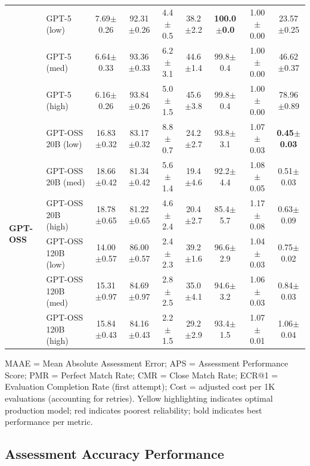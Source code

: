 \documentclass[letterpaper]{article} %
\begin{document}
\begin{table}[t]
\begin{threeparttable}
\begin{tabular}{@{}llccccccc@{}}
& GPT-5 (low) & 7.69$\pm$0.26 & 92.31$\pm$0.26 & 4.4$\pm$0.5 & 38.2$\pm$2.2 & \textbf{100.0$\pm$0.0} & 1.00$\pm$0.00 & 23.57$\pm$0.25 \\
& GPT-5 (med) & 6.64$\pm$0.33 & 93.36$\pm$0.33 & 6.2$\pm$3.1 & 44.6$\pm$1.4 & 99.8$\pm$0.4 & 1.00$\pm$0.00 & 46.62$\pm$0.37 \\
& GPT-5 (high) & 6.16$\pm$0.26 & 93.84$\pm$0.26 & 5.0$\pm$1.5 & 45.6$\pm$3.8 & 99.8$\pm$0.4 & 1.00$\pm$0.00 & 78.96$\pm$0.89 \\
\midrule
\multirow{6}{*}{\textbf{GPT-OSS}} 
& GPT-OSS 20B (low) & 16.83$\pm$0.32 & 83.17$\pm$0.32 & 8.8$\pm$0.7 & 24.2$\pm$2.7 & 93.8$\pm$3.1 & 1.07$\pm$0.03 & \textbf{0.45$\pm$0.03} \\
& GPT-OSS 20B (med) & 18.66$\pm$0.42 & 81.34$\pm$0.42 & 5.6$\pm$1.4 & 19.4$\pm$4.6 & 92.2$\pm$4.4 & 1.08$\pm$0.05 & 0.51$\pm$0.03 \\
& \cellcolor{red!10}GPT-OSS 20B (high) & \cellcolor{red!10}18.78$\pm$0.65 & \cellcolor{red!10}81.22$\pm$0.65 & \cellcolor{red!10}4.6$\pm$2.4 & \cellcolor{red!10}20.4$\pm$2.7 & \cellcolor{red!10}85.4$\pm$5.7 & \cellcolor{red!10}1.17$\pm$0.08 & \cellcolor{red!10}0.63$\pm$0.09 \\
& GPT-OSS 120B (low) & 14.00$\pm$0.57 & 86.00$\pm$0.57 & 2.4$\pm$2.3 & 39.2$\pm$1.6 & 96.6$\pm$2.9 & 1.04$\pm$0.03 & 0.75$\pm$0.02 \\
& GPT-OSS 120B (med) & 15.31$\pm$0.97 & 84.69$\pm$0.97 & 2.8$\pm$2.5 & 35.0$\pm$4.1 & 94.6$\pm$3.2 & 1.06$\pm$0.03 & 0.84$\pm$0.03 \\
& GPT-OSS 120B (high) & 15.84$\pm$0.43 & 84.16$\pm$0.43 & 2.2$\pm$1.5 & 29.2$\pm$2.9 & 93.4$\pm$1.5 & 1.07$\pm$0.01 & 1.06$\pm$0.04 \\
\bottomrule
\end{tabular}
\begin{tablenotes}
\footnotesize
\item MAAE = Mean Absolute Assessment Error; APS = Assessment Performance Score; PMR = Perfect Match Rate; CMR = Close Match Rate; ECR@1 = Evaluation Completion Rate (first attempt); Cost = adjusted cost per 1K evaluations (accounting for retries). Yellow highlighting indicates optimal production model; red indicates poorest reliability; bold indicates best performance per metric.
\end{tablenotes}
\end{threeparttable}
\end{table}

\subsection{Assessment Accuracy Performance}
\end{document}
